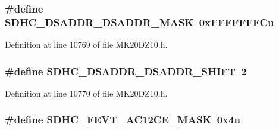 \subsubsection[{\texorpdfstring{S\+D\+H\+C\+\_\+\+D\+S\+A\+D\+D\+R\+\_\+\+D\+S\+A\+D\+D\+R\+\_\+\+M\+A\+SK}{SDHC_DSADDR_DSADDR_MASK}}]{\setlength{\rightskip}{0pt plus 5cm}\#define S\+D\+H\+C\+\_\+\+D\+S\+A\+D\+D\+R\+\_\+\+D\+S\+A\+D\+D\+R\+\_\+\+M\+A\+SK~0x\+F\+F\+F\+F\+F\+F\+F\+Cu}\hypertarget{group___s_d_h_c___register___masks_ga0879039aa6d312f63642daf292ea07e1}{}\label{group___s_d_h_c___register___masks_ga0879039aa6d312f63642daf292ea07e1}


Definition at line 10769 of file M\+K20\+D\+Z10.\+h.

\subsubsection[{\texorpdfstring{S\+D\+H\+C\+\_\+\+D\+S\+A\+D\+D\+R\+\_\+\+D\+S\+A\+D\+D\+R\+\_\+\+S\+H\+I\+FT}{SDHC_DSADDR_DSADDR_SHIFT}}]{\setlength{\rightskip}{0pt plus 5cm}\#define S\+D\+H\+C\+\_\+\+D\+S\+A\+D\+D\+R\+\_\+\+D\+S\+A\+D\+D\+R\+\_\+\+S\+H\+I\+FT~2}\hypertarget{group___s_d_h_c___register___masks_gaab7280ffe17d17dc4e36a58270c97edb}{}\label{group___s_d_h_c___register___masks_gaab7280ffe17d17dc4e36a58270c97edb}


Definition at line 10770 of file M\+K20\+D\+Z10.\+h.

\subsubsection[{\texorpdfstring{S\+D\+H\+C\+\_\+\+F\+E\+V\+T\+\_\+\+A\+C12\+C\+E\+\_\+\+M\+A\+SK}{SDHC_FEVT_AC12CE_MASK}}]{\setlength{\rightskip}{0pt plus 5cm}\#define S\+D\+H\+C\+\_\+\+F\+E\+V\+T\+\_\+\+A\+C12\+C\+E\+\_\+\+M\+A\+SK~0x4u}\hypertarget{group___s_d_h_c___register___masks_gabbde9b3a4bf7a5ba098a8793459a93e3}{}\label{group___s_d_h_c___register___masks_gabbde9b3a4bf7a5ba098a8793459a93e3}


